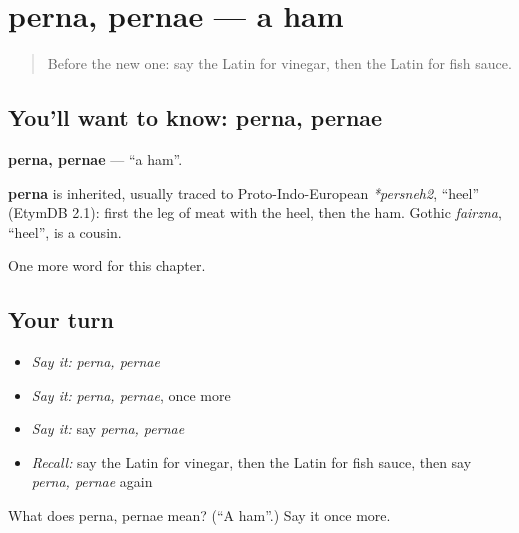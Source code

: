 \section[perna, pernae]{perna, pernae — a ham}

\label{lesson:LA-C195-perna}



\begin{quote}
Before the new one: say the Latin for vinegar, then the Latin for fish sauce.
\end{quote}

\subsection*{You'll want to know: perna, pernae}
\textbf{perna, pernae} — \textquotedblleft{}a ham\textquotedblright{}.

\begin{cousinweb}
\textbf{perna} is inherited, usually traced to Proto-Indo-European \emph{*persneh2}, \textquotedblleft{}heel\textquotedblright{} (EtymDB 2.1): first the leg of meat with the heel, then the ham. Gothic \emph{fairzna}, \textquotedblleft{}heel\textquotedblright{}, is a cousin.
\end{cousinweb}

\begin{grammarlens}[title={What you've built}]
One more word for this chapter.
\end{grammarlens}

\subsection*{Your turn}
\begin{itemize}
\raggedright
  \item \emph{Say it:} \emph{perna, pernae}
  \item \emph{Say it:} \emph{perna, pernae}, once more
  \item \emph{Say it:} say \emph{perna, pernae}
  \item \emph{Recall:} say the Latin for vinegar, then the Latin for fish sauce, then say \emph{perna, pernae} again
\end{itemize}

\begin{tcolorbox}[breakable,colback=teal!4,colframe=teal!35!black,title={Before you move on}]
What does perna, pernae mean? (\textquotedblleft{}A ham\textquotedblright{}.) Say it once more.
\end{tcolorbox}
